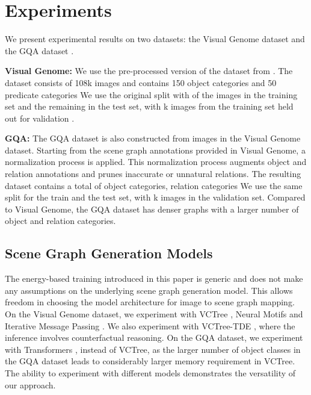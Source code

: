 \documentclass[final]{cvpr}
\begin{document}
\section{Experiments}
We present experimental results on two datasets: the Visual Genome dataset \cite{krishna2017visual} and the GQA dataset \cite{hudson2018gqa}.

\vspace{0.08in}
\noindent
\textbf{Visual Genome:} We use the pre-processed version of the dataset from \cite{xu2017scene}. The dataset consists of 108k images and contains 150 object categories and 50 predicate categories
We use the original split with  of the images in the training set and the remaining  in the test set, with k images from the training set held out for validation \cite{zellers2018neural}.

\vspace{0.08in}
\noindent
\textbf{GQA:} The GQA dataset \cite{hudson2018gqa} is also constructed from images in the Visual Genome dataset. Starting from the scene graph annotations provided in Visual Genome, a normalization process is applied. This normalization process 
augments object and relation annotations and prunes inaccurate or unnatural relations. The resulting dataset contains a total of  object categories,  relation categories 
We use the same  split for the train and the test set, with k images in the validation set. Compared to Visual Genome, the GQA dataset has denser graphs with a larger number of object and relation categories. 


\subsection{Scene Graph Generation Models}
The energy-based training introduced in this paper is generic and does not make any assumptions on the underlying scene graph generation model. This allows freedom in choosing the model architecture for image to scene graph mapping. On the Visual Genome dataset, we experiment with VCTree \cite{tang2019learning}, Neural Motifs \cite{zellers2018neural} and Iterative Message Passing \cite{xu2017scene}. We also experiment with VCTree-TDE \cite{tang2020unbiased}, where the inference involves counterfactual reasoning. On the GQA dataset, we experiment with Transformers \cite{vaswani2017attention}, instead of VCTree, as the larger number of object classes in the GQA dataset leads to considerably larger memory requirement in VCTree. The ability to experiment with different models demonstrates the versatility of our approach.
\end{document}
